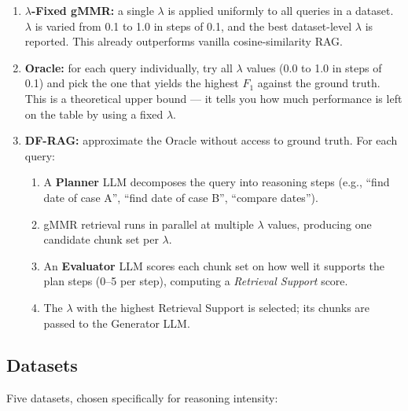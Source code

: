 \documentclass[11pt,a4paper]{article}
\begin{document}
\begin{enumerate}[leftmargin=*]
	\item \textbf{$\lambda$-Fixed gMMR:} a single $\lambda$ is applied uniformly to all queries in a dataset. $\lambda$ is varied from 0.1 to 1.0 in steps of 0.1, and the best dataset-level $\lambda$ is reported. This already outperforms vanilla cosine-similarity RAG.
	\item \textbf{Oracle:} for each query individually, try all $\lambda$ values (0.0 to 1.0 in steps of 0.1) and pick the one that yields the highest $F_1$ against the ground truth. This is a theoretical upper bound --- it tells you how much performance is left on the table by using a fixed $\lambda$.
	\item \textbf{DF-RAG:} approximate the Oracle without access to ground truth. For each query:
	      \begin{enumerate}
		      \item A \textbf{Planner} LLM decomposes the query into reasoning steps (e.g., ``find date of case A'', ``find date of case B'', ``compare dates'').
		      \item gMMR retrieval runs in parallel at multiple $\lambda$ values, producing one candidate chunk set per $\lambda$.
		      \item An \textbf{Evaluator} LLM scores each chunk set on how well it supports the plan steps (0--5 per step), computing a \emph{Retrieval Support} score.
		      \item The $\lambda$ with the highest Retrieval Support is selected; its chunks are passed to the Generator LLM.
	      \end{enumerate}
\end{enumerate}

\subsection{Datasets}

Five datasets, chosen specifically for reasoning intensity:
\end{document}
